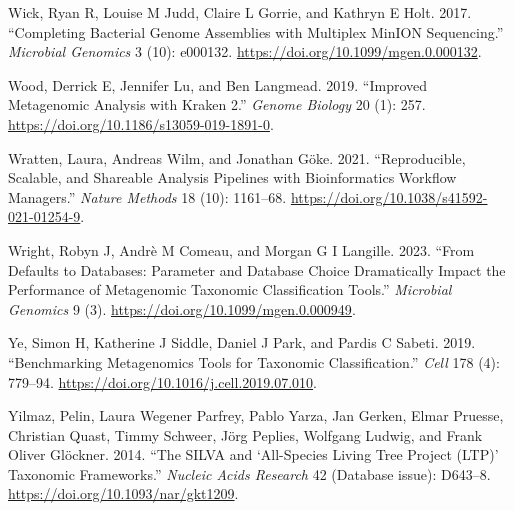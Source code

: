 \documentclass[
]{article}
\newlength{\cslhangindent}
\newlength{\cslentryspacingunit} %
\newenvironment{CSLReferences}[2] %
 {%
  \setlength{\parindent}{0pt}
  \ifodd #1
  \let\oldpar\par
  \def\par{\hangindent=\cslhangindent\oldpar}
  \fi
  \setlength{\parskip}{#2\cslentryspacingunit}
 }%
 {}
\begin{document}
\begin{CSLReferences}{1}{0}
\leavevmode{}%
Wick, Ryan R, Louise M Judd, Claire L Gorrie, and Kathryn E Holt. 2017.
{``Completing Bacterial Genome Assemblies with Multiplex {MinION}
Sequencing.''} \emph{Microbial Genomics} 3 (10): e000132.
\url{https://doi.org/10.1099/mgen.0.000132}.

\leavevmode{}%
Wood, Derrick E, Jennifer Lu, and Ben Langmead. 2019. {``Improved
Metagenomic Analysis with Kraken 2.''} \emph{Genome Biology} 20 (1):
257. \url{https://doi.org/10.1186/s13059-019-1891-0}.

\leavevmode{}%
Wratten, Laura, Andreas Wilm, and Jonathan Göke. 2021. {``Reproducible,
Scalable, and Shareable Analysis Pipelines with Bioinformatics Workflow
Managers.''} \emph{Nature Methods} 18 (10): 1161--68.
\url{https://doi.org/10.1038/s41592-021-01254-9}.

\leavevmode{}%
Wright, Robyn J, Andrè M Comeau, and Morgan G I Langille. 2023. {``From
Defaults to Databases: Parameter and Database Choice Dramatically Impact
the Performance of Metagenomic Taxonomic Classification Tools.''}
\emph{Microbial Genomics} 9 (3).
\url{https://doi.org/10.1099/mgen.0.000949}.

\leavevmode{}%
Ye, Simon H, Katherine J Siddle, Daniel J Park, and Pardis C Sabeti.
2019. {``Benchmarking Metagenomics Tools for Taxonomic
Classification.''} \emph{Cell} 178 (4): 779--94.
\url{https://doi.org/10.1016/j.cell.2019.07.010}.

\leavevmode{}%
Yilmaz, Pelin, Laura Wegener Parfrey, Pablo Yarza, Jan Gerken, Elmar
Pruesse, Christian Quast, Timmy Schweer, Jörg Peplies, Wolfgang Ludwig,
and Frank Oliver Glöckner. 2014. {``The {SILVA} and {`All-Species Living
Tree Project ({LTP})'} Taxonomic Frameworks.''} \emph{Nucleic Acids
Research} 42 (Database issue): D643--8.
\url{https://doi.org/10.1093/nar/gkt1209}.

\end{CSLReferences}
\end{document}
